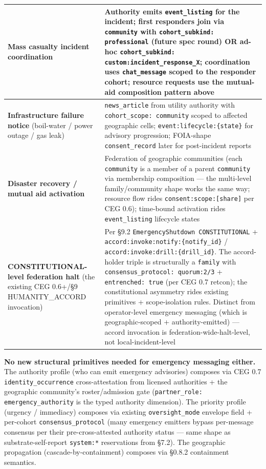 \documentclass[10pt]{article}
\begin{document}
{\begin{longtable}{|p{8.0cm}|p{8.0cm}|}
\textbf{Mass casualty incident coordination} & Authority emits \texttt{event\_listing} for the incident; first responders join via \texttt{community} with \texttt{cohort\_subkind: professional} (future spec round) OR ad-hoc \texttt{cohort\_subkind: custom:incident\_response\_X}; coordination uses \texttt{chat\_message} scoped to the responder cohort; resource requests use the mutual-aid composition pattern above \\ \hline
\textbf{Infrastructure failure notice} (boil-water / power outage / gas leak) & \texttt{news\_article} from utility authority with \texttt{cohort\_scope: community} scoped to affected geographic cells; \texttt{event:lifecycle:\{state\}} for advisory progression; FOIA-shape \texttt{consent\_record} later for post-incident reports \\ \hline
\textbf{Disaster recovery / mutual aid activation} & Federation of geographic communities (each \texttt{community} is a member of a parent \texttt{community} via membership composition — the multi-level family/community shape works the same way; resource flow rides \texttt{consent:scope:[share]} per CEG 0.6); time-bound activation rides \texttt{event\_listing} lifecycle states \\ \hline
\textbf{CONSTITUTIONAL-level federation halt} (the existing CEG 0.6+/§9 HUMANITY\_ACCORD invocation) & Per §9.2 \texttt{EmergencyShutdown CONSTITUTIONAL} + \texttt{accord:invoke:notify:\{notify\_id\}} / \texttt{accord:invoke:drill:\{drill\_id\}}. The accord-holder triple is structurally a \texttt{family} with \texttt{consensus\_protocol: quorum:2/3} + \texttt{entrenched: true} (per CEG 0.7 retcon); the constitutional asymmetry rides existing primitives + scope-isolation rules. Distinct from operator-level emergency messaging (which is geographic-scoped + authority-emitted) — accord invocation is federation-wide-halt-level, not local-incident-level \\ \hline
\end{longtable}}


\textbf{No new structural primitives needed for emergency messaging either.} The authority profile (who can emit emergency advisories) composes via CEG 0.7 \texttt{identity\_occurrence} cross-attestation from licensed authorities + the geographic community's roster/admission gate (\texttt{partner\_role: emergency\_authority} is the typed authority dimension). The priority profile (urgency / immediacy) composes via existing \texttt{oversight\_mode} envelope field + per-cohort \texttt{consensus\_protocol} (many emergency emitters bypass per-message consensus per their pre-cross-attested authority status — same shape as substrate-self-report \texttt{system:*} reservations from §7.2). The geographic propagation (cascade-by-containment) composes via §0.8.2 containment semantics.
\end{document}
